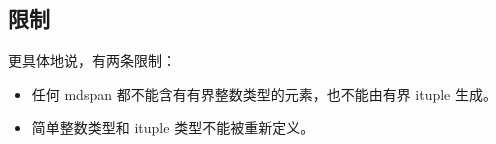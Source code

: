 \subsection*{限制}

更具体地说，有两条限制：

\begin{itemize}[leftmargin=1.6em]
\item 任何 mdspan 都不能含有有界整数类型的元素，也不能由有界 ituple 生成。
\item 简单整数类型和 ituple 类型不能被重新定义。
\end{itemize}
